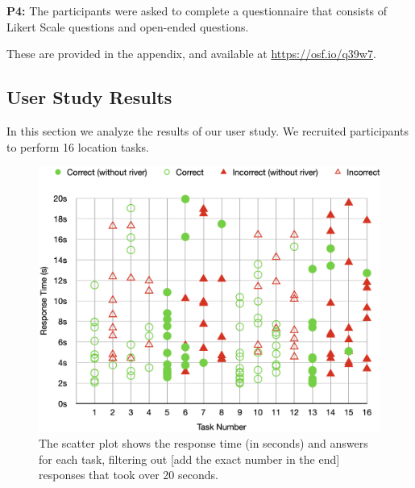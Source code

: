 \textbf{P4:} The participants were asked to complete a questionnaire that consists of Likert Scale questions and open-ended questions.

These are provided in the appendix, and available at \url{https://osf.io/q39w7}.

\subsection{User Study Results}

In this section we analyze the results of our user study. We recruited \pCount participants to perform 16 location tasks. 

{
    \begin{figure}[htb!]
        \centering
        \includegraphics[width=\columnwidth,keepaspectratio]{figure/evaluation/task-rt.png}
        \caption{The scatter plot shows the response time (in seconds) and answers for each task, filtering out [add the exact number in the end] responses that took over 20 seconds.}
        \label{fig:task-rt}
    \end{figure}
}

\color{black}